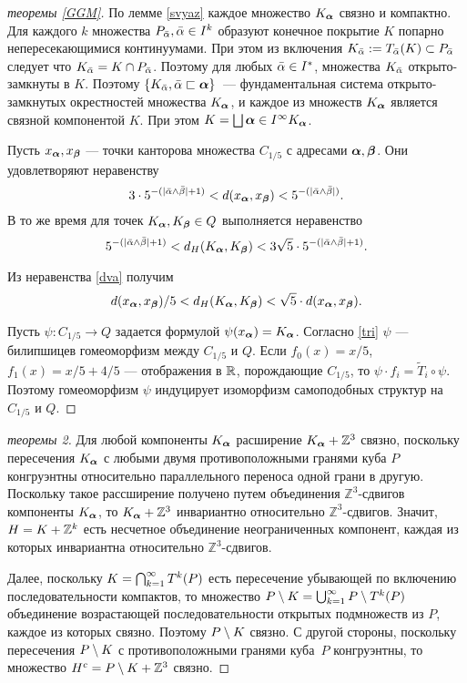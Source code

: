 \begin{proof}[теоремы \ref{GGM}]
По лемме \ref{svyaz} каждое множество $K_{\bm{\alpha}}$ связно и компактно. 
Для каждого $k$ множества $P_{\bar{\alpha}}, \bar{\alpha}\in I^k$ образуют конечное покрытие $K$ попарно непересекающимися континуумами. 
При этом из включения $K_{\bar{\alpha}}:=T_{\bar{\alpha}}(K)\subset P_{\bar{\alpha}}$ следует что $K_{\bar{\alpha}}= K\cap P_{\bar{\alpha}}$. 
Поэтому для любых ${\bar{\alpha}}\in I^*$, множества $K_{\bar{\alpha}}$ открыто-замкнуты в $K$. 
Поэтому  $\{K_{\bar{\alpha}},{\bar{\alpha}}\sqsubset{\bm{\alpha}}\}$~--- фундаментальная система открыто-замкнутых окрестностей множества $K_{\bm{\alpha}}$, и каждое из множеств $K_{\bm{\alpha}}$ является связной компонентой $K$. 
При этом $K=\bigsqcup\limits{{\bm{\alpha}}\in I^\infty}K_{\bm{\alpha}}$.

Пусть $x_{\bm{\alpha}}, x_{\bm{\beta}}$ --- точки канторова множества $C_{1/5}$ с адресами ${\bm{\alpha}}, {\bm{\beta}}$. 
Они удовлетворяют неравенству
$$3\cdot5^{-(|\bar{\alpha}\wedge\bar{\beta}|+1)} < d(x_{\bm{\alpha}}, x_{\bm{\beta}}) < 5^{-(|\bar{\alpha}\wedge\bar{\beta}|)}.$$
В то же время для точек $K_{{\bm{\alpha}}},K_{{\bm{\beta}}}\in Q$ выполняется неравенство
\begin{equation}\label{dva} 
5^{-(|\bar{\alpha}\wedge\bar{\beta}|+1)} < d_H(K_{{\bm{\alpha}}},K_{{\bm{\beta}}}) < 3\sqrt5\cdot 5^{-(|\bar{\alpha}\wedge\bar{\beta}|+1)}.
\end{equation}

Из неравенства \eqref{dva} получим
\begin{equation}\label{tri} 
d(x_{\bm{\alpha}}, x_{\bm{\beta}})/5<d_H(K_{{\bm{\alpha}}},K_{{\bm{\beta}}})< \sqrt5\cdot d(x_{\bm{\alpha}}, x_{\bm{\beta}}).
\end{equation}

Пусть $\psi:C_{1/5}\to Q$  задается формулой $\psi(x_{\bm{\alpha}})=K_{\bm{\alpha}}$. Согласно \eqref{tri}  $\psi$  --- билипшицев гомеоморфизм между $C_{1/5}$ и $Q$. 
Если $f_0(x)=x/5$, $f_1(x)=x/5+4/5$  --- отображения в $\mathbb{R}$, порождающие $C_{1/5}$, то $\psi\cdot f_i=\tilde T_i\circ\psi$. 
Поэтому гомеоморфизм $\psi$ индуцирует изоморфизм самоподобных структур на $C_{1/5}$ и $Q$. 
\end{proof}

\begin{proof}[теоремы 2]
Для любой компоненты $K_{\bm{\alpha}}$ расширение $K_{\bm{\alpha}}+\mathbb{Z}^3$ связно, поскольку  пересечения $K_{\bm{\alpha}}$ с любыми двумя противоположными гранями куба $P$ конгруэнтны относительно параллельного переноса одной грани в другую.
Поскольку такое рассширение получено путем объединения $\mathbb{Z}^3$-сдвигов компоненты $K_{\bm{\alpha}}$, то $K_{\bm{\alpha}}+\mathbb{Z}^3$ инвариантно относительно $\mathbb{Z}^3$-сдвигов. 
Значит, $H=K+\mathbb{Z}^k$ есть несчетное объединение неограниченных компонент, каждая из которых инвариантна относительно $\mathbb{Z}^3$-сдвигов.

Далее, поскольку $K=\bigcap_{k=1}^\infty T^k(P)$ есть пересечение убывающей по включению последовательности компактов, то множество $P\setminus K=\bigcup_{k=1}^\infty P\setminus T^k(P)$ объединение возрастающей последовательности открытых подмножеств из $P$, каждое из которых связно. 
Поэтому $P\setminus K$ связно. С другой стороны, поскольку пересечения $P\setminus K$ с противоположными гранями куба~$P$ конгруэнтны, то множество $H^c=P\setminus K +\mathbb{Z}^3$ связно. 
\end{proof}



